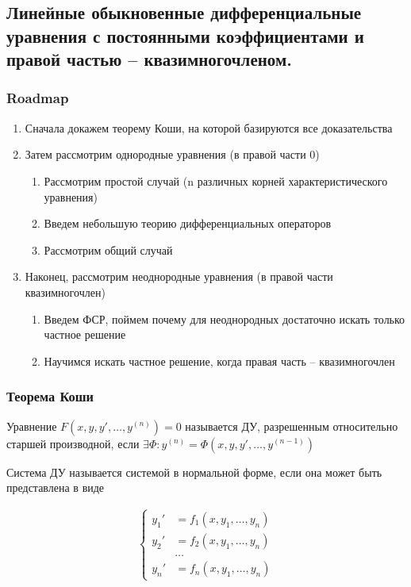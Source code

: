 \subsection{Линейные обыкновенные дифференциальные уравнения с постоянными коэффициентами и правой частью – квазимногочленом.}

\subsubsection{Roadmap}

\begin{enumerate}
    \item Сначала докажем теорему Коши, на которой базируются все доказательства
    \item Затем рассмотрим однородные уравнения (в правой части 0)
    \begin{enumerate}
        \item Рассмотрим простой случай (n различных корней характеристического уравнения)
        \item Введем небольшую теорию дифференциальных операторов
        \item Рассмотрим общий случай
    \end{enumerate}
    \item Наконец, рассмотрим неоднородные уравнения (в правой части квазимногочлен)
    \begin{enumerate}
        \item Введем ФСР, поймем почему для неоднородных достаточно искать только частное решение
        \item Научимся искать частное решение, когда правая часть -- квазимногочлен
    \end{enumerate}
\end{enumerate}

\subsubsection{Теорема Коши}

\Def Уравнение $F(x, y, y', \dots, y^{(n)}) = 0$ называется ДУ, разрешенным относительно старшей производной, если $\exists \Phi: y^{(n)} = \Phi(x, y, y', \dots, y^{(n-1)})$

\Def Система ДУ называется системой в нормальной форме, если она может быть представлена в виде

\begin{align*}
    \begin{cases}
        y_1'&= f_1(x, y_1, \dots, y_n) \\
        y_2'&= f_2(x, y_1, \dots, y_n) \\
        &\dots \\
        y_n'&= f_n(x, y_1, \dots, y_n)
    \end{cases}
\end{align*}

